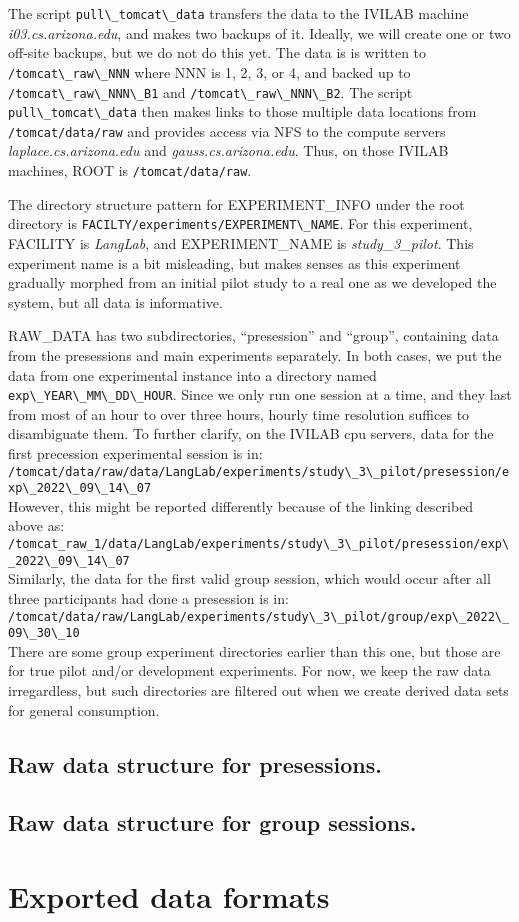 \documentclass[12pt,letterpaper,oneside,openany]{article}
\newcommand{\code}[1]{\lstinline{#1}}
\begin{document}
The
script \code{pull\_tomcat\_data} transfers the data to the IVILAB machine
\textit{i03.cs.arizona.edu}, and makes two backups of it. 
Ideally, we will create one or two off-site backups, but we do not do this yet.
The data is is written to
\code{/tomcat\_raw\_NNN} where NNN is 1, 2, 3, or 4, and backed up to 
\code{/tomcat\_raw\_NNN\_B1} and \code{/tomcat\_raw\_NNN\_B2}.  
The script \code{pull\_tomcat\_data} then makes links to those multiple data
locations from \code{/tomcat/data/raw} and provides access via NFS to the compute
servers \textit{laplace.cs.arizona.edu} and \textit{gauss.cs.arizona.edu}.
Thus, on those IVILAB machines, ROOT is \code{/tomcat/data/raw}.

The directory structure pattern for EXPERIMENT\_INFO under the root directory is
\code{FACILTY/experiments/EXPERIMENT\_NAME}. For this experiment, FACILITY is
\textit{LangLab}, and EXPERIMENT\_NAME is \textit{study\_3\_pilot}.
This experiment name is a bit misleading, but makes senses as this experiment
gradually morphed from an initial pilot study to a real one as we developed the
system, but all data is informative. 

RAW\_DATA has two subdirectories, ``presession'' and ``group'', containing data
from the presessions and main experiments separately. In both cases, we put the
data from one experimental instance into a directory named
\code{exp\_YEAR\_MM\_DD\_HOUR}. Since we only run one session at a time, and
they last from most of an hour to over three hours, hourly time resolution
suffices to disambiguate them. To further clarify, on the IVILAB cpu servers, data for the first precession
experimental session is in:\\
\code{/tomcat/data/raw/data/LangLab/experiments/study\_3\_pilot/presession/exp\_2022\_09\_14\_07}\\
However, this might be reported differently because of the linking described
above as:\\
\code{/tomcat_raw_1/data/LangLab/experiments/study\_3\_pilot/presession/exp\_2022\_09\_14\_07}\\
Similarly, the data for the first valid group session, which would occur after all
three participants had done a presession is in:\\
\code{/tomcat/data/raw/LangLab/experiments/study\_3\_pilot/group/exp\_2022\_09\_30\_10}\\
There are some group experiment directories earlier than this one, but those
are for true pilot and/or development experiments. For now, we keep the raw
data irregardless, but such directories are filtered out when we create derived
data sets for general consumption.

\subsection{Raw data structure for presessions.}

\subsection{Raw data structure for group sessions.}


\section{Exported data formats}
\end{document}
